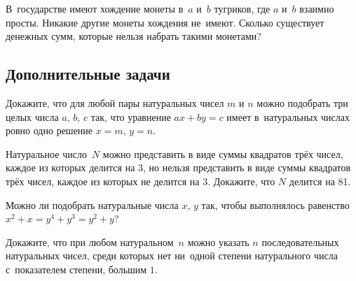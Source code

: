 


В~государстве имеют хождение монеты в~$a$ и~$b$ тугриков, где
$a$ и~$b$ взаимно просты.
Никакие другие монеты хождения не~имеют.
Сколько существует денежных сумм, которые нельзя набрать такими монетами?


\subsection*{Дополнительные задачи}

\begin{problems}

\item
Докажите, что для любой пары натуральных чисел $m$ и $n$ можно подобрать три
целых числа $a$, $b$, $c$ так, что уравнение $a x + b y = c$ имеет
в~натуральных числах ровно одно решение $x = m$, $y = n$.

\item
Натуральное число~$N$ можно представить в виде суммы квадратов трёх чисел,
каждое из которых делится на $3$, но нельзя представить в виде суммы квадратов
трёх чисел, каждое из которых не делится на $3$.
Докажите, что $N$ делится на 81.

\item
Можно ли подобрать натуральные числа $x$, $y$ так, чтобы выполнялось равенство
$x^2 + x = y^4 + y^3 = y^2 + y$?

\item
Докажите, что при любом натуральном~$n$ можно указать $n$ последовательных
натуральных чисел, среди которых нет ни~одной степени натурального числа
с~показателем степени, большим $1$.

\end{problems}

